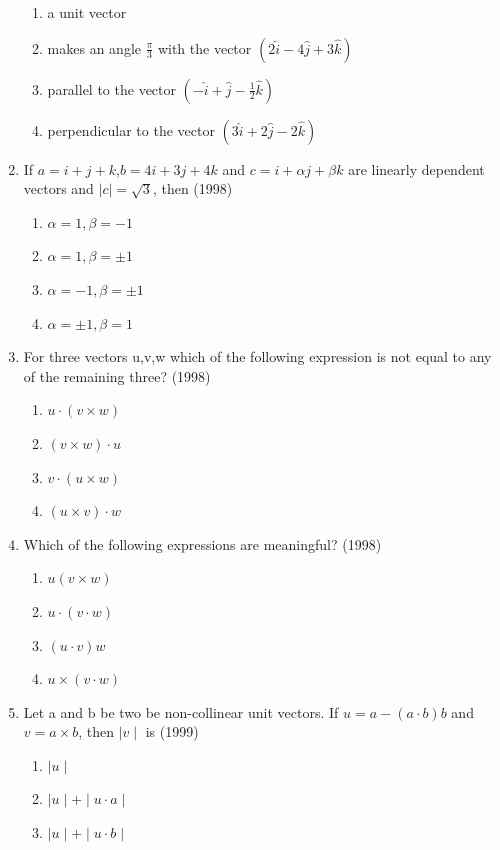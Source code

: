 \documentclass[12pt]{article}
\providecommand{\brak}[1]{\ensuremath{\left(#1\right)}}
\begin{document}
\begin{enumerate}
\begin{enumerate}
\item a unit vector
\item makes an angle $\frac{\pi}{3}$ with the vector $\brak{2\hat{i}-4\hat{j}+3\hat{k}}$
\item parallel to the vector $\brak{-\hat{i}+\hat{j}-\frac{1}{2}\hat{k}}$
\item perpendicular to the vector $\brak{3\hat{i}+2\hat{j}-2\hat{k}}$
\end{enumerate}
\item If $a=i+j+k$,$b=4i+3j+4k$ and $c=i+\alpha j+\beta k$ are linearly dependent vectors and $\mid c \mid=\sqrt{3}$, then (1998)
\begin{enumerate}
\item $\alpha =1, \beta =-1$
\item $\alpha =1, \beta = \pm 1$
\item $\alpha =-1, \beta =\pm1$
\item $\alpha =\pm1, \beta =1$
\end{enumerate}
\item For three vectors u,v,w which of the following expression is not equal to any of the remaining three? (1998)
\begin{enumerate}
\item $u\cdot\brak{v \times w}$
\item $\brak{v \times w}\cdot u$
\item $v\cdot\brak{u \times w}$
\item $\brak{u \times v}\cdot w$
\end{enumerate}
\item Which of the following expressions are meaningful? (1998)
\begin{enumerate}
\item $u\brak{v \times w}$
\item $u\cdot\brak{v \cdot w}$
\item $\brak{u \cdot v}w$
\item $u \times \brak{v \cdot w}$
\end{enumerate}
\item Let a and b be two be non-collinear unit vectors. If $u=a-\brak{a\cdot b}b$ and $v=a\times b$, then $\mid v \mid$ is (1999)
\begin{enumerate}
\item $\mid u \mid$
\item $\mid u \mid + \mid u \cdot a \mid$
\item $\mid u \mid + \mid u \cdot b \mid$

\end{enumerate}
\end{enumerate}
\end{document}
